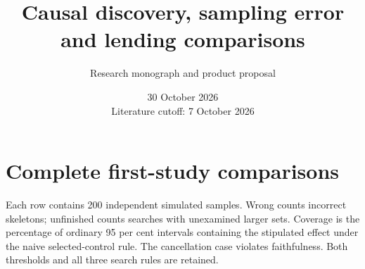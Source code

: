 \documentclass[11pt,a4paper,openany]{book}
\title{\sffamily\bfseries\color{ink}Causal discovery, sampling error and lending comparisons}\author{Research monograph and product proposal}
\date{30 October 2026\\Literature cutoff: 7 October 2026}
\begin{document}
\frontmatter\maketitle\mainmatter

\appendix
\chapter{Complete first-study comparisons}
Each row contains 200 independent simulated samples. Wrong counts incorrect
skeletons; unfinished counts searches with unexamined larger sets. Coverage
is the percentage of ordinary 95 per cent intervals containing the stipulated
effect under the naive selected-control rule. The cancellation case violates
faithfulness. Both thresholds and all three search rules are retained.
\small

\normalsize
\backmatter


\end{document}
